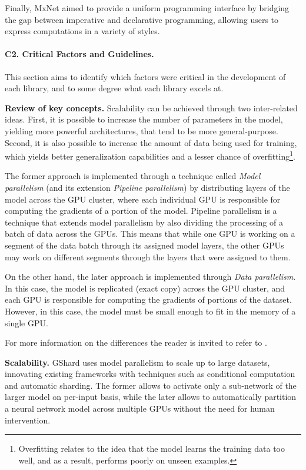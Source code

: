 Finally, MxNet \cite{chen_mxnet_2015} aimed to provide a uniform programming interface by bridging
the gap between imperative and declarative programming, allowing users to express computations in a
variety of styles.

\paragraph{C2. Critical Factors and Guidelines.}
This section aims to identify which factors were critical in the development of each library, and
to some degree what each library excels at.

\textbf{Review of key concepts.}
Scalability can be achieved through two inter-related ideas. First, it is possible to increase the number of parameters in the
model, yielding more powerful architectures, that tend to be more general-purpose. Second, it is also possible to increase the
amount of data being used for training, which yields better generalization capabilities and a lesser chance of
overfitting\footnote{Overfitting relates to the idea that the model learns the training data too well, and as a result,
	performs poorly on unseen examples.}.

The former approach is implemented through a technique called {\em{Model parallelism}} (and its
extension {\em{Pipeline parallelism}}) by distributing layers of the model across the GPU cluster,
where each individual GPU is responsible for computing the gradients of a portion of the model.
Pipeline parallelism is a technique that extends model parallelism by also dividing the processing
of a batch of data across the GPUs. This means that while one GPU is working on a segment of the
data batch through its assigned model layers, the other GPUs may work on different segments through
the layers that were assigned to them.

On the other hand, the later approach is implemented through {\em{Data parallelism}}. In this case,
the model is replicated (exact copy) across the GPU cluster, and each GPU is responsible for
computing the gradients of portions of the dataset. However, in this case, the model must be small
enough to fit in the memory of a single GPU.

For more information on the differences the reader is invited to refer to
\cite{dehghani_distributed_2023}.

\textbf{Scalability.}
GShard \cite{lepikhin_gshard_2020} uses model parallelism to scale up to large
datasets, innovating existing frameworks with techniques such as conditional computation and
automatic sharding. The former allows to activate only a sub-network of the larger model on
per-input basis, while the later allows to automatically partition a neural network model across
multiple GPUs without the need for human intervention.

